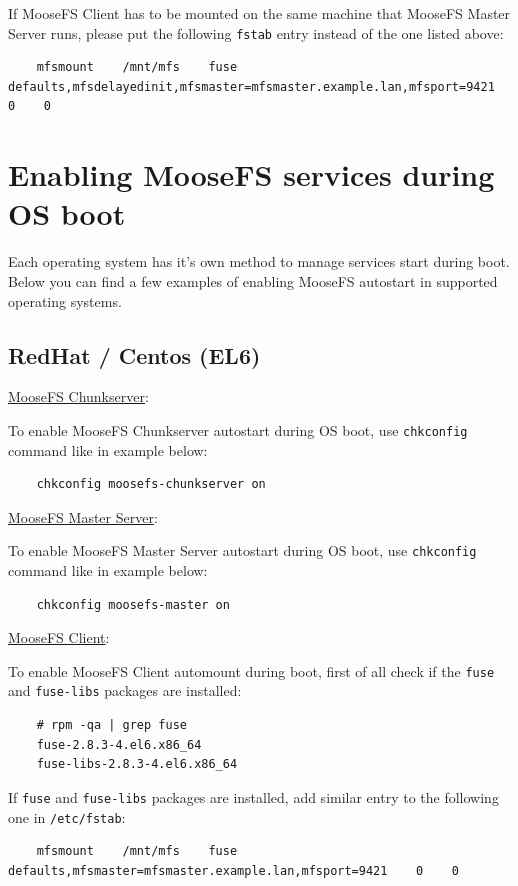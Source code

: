\documentclass[a4paper,11pt,english]{report}
\def\code#1{\texttt{#1}}
\begin{document}
		If MooseFS Client has to be mounted on the same machine that MooseFS Master Server runs, please put the following \code{fstab} entry instead of the one listed above:
		
		\begin{lstlisting}
	mfsmount    /mnt/mfs    fuse    defaults,mfsdelayedinit,mfsmaster=mfsmaster.example.lan,mfsport=9421    0    0 
		\end{lstlisting}

		\newpage

		\section{Enabling MooseFS services during OS boot}
		Each operating system has it's own method to manage services start during boot. Below you can find a few examples of enabling MooseFS autostart in supported operating systems.
		
					
		\subsection{RedHat / Centos (EL6)}
		
		\underline{MooseFS Chunkserver}:
		
		To enable MooseFS Chunkserver autostart during OS boot, use \code{chkconfig} command like in example below:
		\begin{lstlisting}
	chkconfig moosefs-chunkserver on
		\end{lstlisting}
		
		\underline{MooseFS Master Server}:
		
		To enable MooseFS Master Server autostart during OS boot, use \code{chkconfig} command like in example below:
		\begin{lstlisting}
	chkconfig moosefs-master on
		\end{lstlisting}
		
		\underline{MooseFS Client}:
		
		To enable MooseFS Client automount during boot, first of all check if the \code{fuse} and \code{fuse-libs} packages are installed:
		\begin{lstlisting}
	# rpm -qa | grep fuse
	fuse-2.8.3-4.el6.x86_64
	fuse-libs-2.8.3-4.el6.x86_64
		\end{lstlisting}
		
		If \code{fuse} and \code{fuse-libs} packages are installed, add similar entry to the following one in \code{/etc/fstab}:

		\begin{lstlisting}
	mfsmount    /mnt/mfs    fuse    defaults,mfsmaster=mfsmaster.example.lan,mfsport=9421    0    0 
		\end{lstlisting}
		
\end{document}

